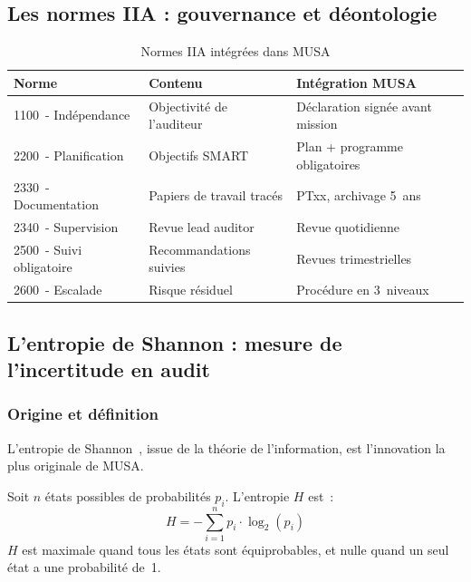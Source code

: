 \documentclass[12pt,a4paper,oneside]{report}
\begin{document}
\subsection{Les normes IIA : gouvernance et d\'eontologie}

\begin{table}[H]
\centering\small
\caption{Normes IIA int\'egr\'ees dans MUSA}
\label{tab:iia}
\begin{tabularx}{\textwidth}{p{3cm}p{5cm}X}
\toprule
\rowcolor{theadcolor}
\color{white}\textbf{Norme} &
\color{white}\textbf{Contenu} &
\color{white}\textbf{Int\'egration MUSA} \\
\midrule
1100~- Ind\'ependance & Objectivit\'e de l'auditeur &
  D\'eclaration sign\'ee avant mission \\
2200~- Planification & Objectifs SMART &
  Plan + programme obligatoires \\
2330~- Documentation & Papiers de travail trac\'es &
  PTxx, archivage 5~ans \\
2340~- Supervision & Revue lead auditor &
  Revue quotidienne \\
2500~- Suivi obligatoire & Recommandations suivies &
  Revues trimestrielles \\
2600~- Escalade & Risque r\'esiduel &
  Proc\'edure en 3~niveaux \\
\bottomrule
\end{tabularx}
\end{table}

\subsection{L'entropie de Shannon : mesure de l'incertitude en audit}

\subsubsection{Origine et d\'efinition}

L'entropie de Shannon~\cite{shannon1948}, issue de la th\'eorie de l'information,
est l'innovation la plus originale de MUSA.

\begin{goldbox}[title={\color{navy}\bfseries Entropie de Shannon}]
Soit $n$ \'etats possibles de probabilit\'es $p_i$. L'entropie $H$ est~:
\[
  H = -\sum_{i=1}^{n} p_i \cdot \log_2(p_i)
\]
$H$ est maximale quand tous les \'etats sont \'equiprobables, et nulle
quand un seul \'etat a une probabilit\'e de~1.
\end{goldbox}
\end{document}
